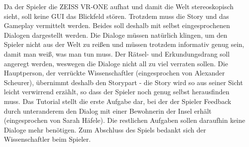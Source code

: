 
Da der Spieler die ZEISS VR-ONE aufhat und damit die Welt stereoskopisch sieht, soll keine GUI das Blickfeld stören. Trotzdem muss die Story und das Gameplay vermittelt werden. Beides soll deshalb mit selbst eingesprochenen Dialogen dargestellt werden. Die Dialoge müssen natürlich klingen, um den Spieler nicht aus der Welt zu reißen und müssen trotzdem informativ genug sein, damit man weiß, was man tun muss. Der Rätsel- und Erkundungsdrang soll angeregt werden, weswegen die Dialoge nicht all zu viel verraten sollen.
Die Hauptperson, der verrückte Wissenschaftler (eingesprochen von Alexander Scheurer), übernimmt deshalb den Storypart - die Story wird so aus seiner Sicht leicht verwirrend erzählt, so dass der Spieler noch genug selbst herausfinden muss. Das Tutorial stellt die erste Aufgabe dar, bei der der Spieler Feedback durch unteranderem den Dialog mit einer Bewohnerin der Insel erhält (eingesprochen von Sarah Häfele). Die restlichen Aufgaben sollen daraufhin keine Dialoge mehr benötigen.
Zum Abschluss des Spiels bedankt sich der Wissenschaftler beim Spieler. 